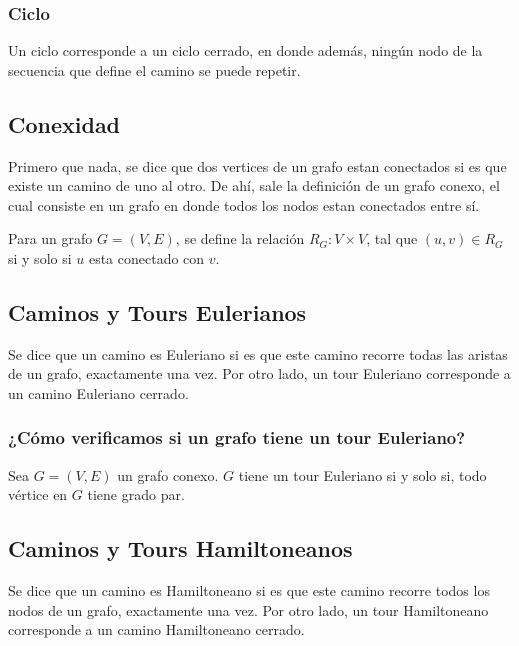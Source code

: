 \documentclass[../main.tex]{subfiles}
\begin{document}
\subsubsection{Ciclo}
Un ciclo corresponde a un ciclo cerrado, en donde además, ningún nodo de la secuencia que define el camino se puede repetir.

\subsection{Conexidad}
Primero que nada, se dice que dos vertices de un grafo estan conectados si es que existe un camino de uno al otro. De ahí, sale la definición de un grafo conexo, el cual consiste en un grafo en donde todos los nodos estan conectados entre sí.

Para un grafo $G = (V,E)$, se define la relación $R_G: V \times V$, tal que $(u,v) \in R_G$ si y solo si $u$ esta conectado con $v$.

\subsection{Caminos y Tours Eulerianos}
Se dice que un camino es Euleriano si es que este camino recorre todas las aristas de un grafo, exactamente una vez. Por otro lado, un tour Euleriano corresponde a un camino Euleriano cerrado.

\subsubsection{¿Cómo verificamos si un grafo tiene un tour Euleriano?}
Sea $G = (V,E)$ un grafo conexo. $G$ tiene un tour Euleriano si y solo si, todo vértice en $G$ tiene grado par.

\subsection{Caminos y Tours Hamiltoneanos}
Se dice que un camino es Hamiltoneano si es que este camino recorre todos los nodos de un grafo, exactamente una vez. Por otro lado, un tour Hamiltoneano corresponde a un camino Hamiltoneano cerrado.
\end{document}
